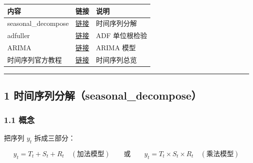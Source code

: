 {\def\LTcaptype{none} %
\begin{longtable}[]{@{}
  >{\raggedright\arraybackslash}p{}
  >{\raggedright\arraybackslash}p{}
  >{\raggedright\arraybackslash}p{}@{}}
\toprule\noalign{}
\begin{minipage}[b]{\linewidth}\raggedright
内容
\end{minipage} & \begin{minipage}[b]{\linewidth}\raggedright
链接
\end{minipage} & \begin{minipage}[b]{\linewidth}\raggedright
说明
\end{minipage} \\
\midrule\noalign{}
\endhead
\bottomrule\noalign{}
\endlastfoot
seasonal\_decompose &
\href{https://www.statsmodels.org/stable/generated/statsmodels.tsa.seasonal.seasonal_decompose.html}{链接}
& 时间序列分解 \\
adfuller &
\href{https://www.statsmodels.org/stable/generated/statsmodels.tsa.stattools.adfuller.html}{链接}
& ADF 单位根检验 \\
ARIMA &
\href{https://www.statsmodels.org/stable/generated/statsmodels.tsa.arima.model.ARIMA.html}{链接}
& ARIMA 模型 \\
时间序列官方教程 &
\href{https://www.statsmodels.org/stable/tsa.html}{链接} &
时间序列总览 \\
\end{longtable}
}

\begin{center}\rule{0.5\linewidth}{0.5pt}\end{center}

\subsection{1
时间序列分解（seasonal\_decompose）}\label{ux65f6ux95f4ux5e8fux5217ux5206ux89e3seasonal_decompose}

\subsubsection{1.1 概念}\label{ux6982ux5ff5-2}

把序列 \(y_t\) 拆成三部分：

\[
y_t = T_t + S_t + R_t \quad(\text{加法模型})
\qquad\text{或}\qquad
y_t = T_t \times S_t \times R_t \quad(\text{乘法模型})
\]

